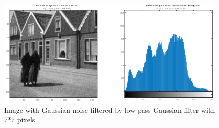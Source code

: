 \newpage

\begin{figure} [ht]
    \centering
    \includegraphics[scale = 1, angle=0]{Resources/Image with Gaussian noise filtered by low-pass Gaussian filter.png}
    \caption{Image with Gaussian noise filtered by low-pass Gaussian filter with 7*7 pixels}
    \label{fig:ApplyingFilters}
\end{figure}


